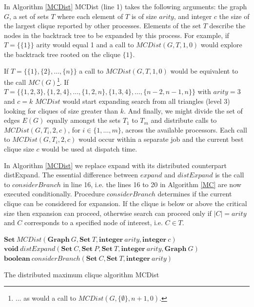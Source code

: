 \documentclass{l4proj}
\begin{document}
In Algorithm \ref{MCDist} MCDist (line 1) takes the 
following arguments: the graph $G$, a set of sets $T$ where 
each element of $T$ is of size $arity$, and integer $c$ the size of the largest clique reported by other processes. Elements
of the set $T$ describe the nodes in the backtrack tree to be expanded by this process. For example, if 
$T = \{\{1\}\}$ arity would equal 1 and a call to $MCDist(G,T,1,0)$ would explore the backtrack tree rooted on the clique $\{1\}$.

If $T = \{\{1\},\{2\},\ldots,\{n\}\}$ a call to $MCDist(G,T,1,0)$ would be equivalent to the call 
$MC(G)$\footnote{... as would a call to $MCDist(G,\{\emptyset\},n+1,0)$.}.
If $T = \{\{1,2,3\},\{1,2,4\},\ldots,\{1,2,n\},\{1,3,4\},\ldots,\{n-2,n-1,n\}\}$ with $arity = 3$ and $c = k$
$MCDist$ would start expanding search from all triangles (level 3) looking for cliques of size greater than $k$.
And finally, we might divide the set of edges $E(G)$ equally amongst the sets $T_1$ to $T_m$ and
distribute calls to $MCDist(G,T_{i},2,c)$, for $i \in \{1,\ldots,m\}$, across the available processors. Each call to
$MCDist(G,T_{i},2,c)$ would occur within a separate job and the current best clique size $c$ would be used at dispatch time.

In Algorithm \ref{MCDist} we replace expand with its distributed counterpart distExpand. The essential difference between 
$expand$ and $distExpand$ is the call to $considerBranch$ in line 16, i.e. the lines 16 to 20 
in Algorithm \ref{MC} are now executed conditionally. Procedure $considerBranch$ determines if the current clique can be 
considered for expansion. If the clique is below or above the critical size then expansion can proceed, otherwise
search can proceed only if $|C| = arity$ and $C$ corresponds to a specified node of interest, i.e. $C \in T$.

\begin{algorithm}
\DontPrintSemicolon
\nl $\textbf{Set} ~ MCDist(\textbf{Graph}~G,\textbf{Set}~T,\textbf{integer}~arity,\textbf{integer}~c)$ \;
\nl {}
\;
\nl $\textbf{void} ~ distExpand(\textbf{Set}~C,\textbf{Set}~P,\textbf{Set}~T,\textbf{integer}~arity,\textbf{Graph}~G)$ \;
\nl {}
\;
\nl $\textbf{boolean} ~ considerBranch(\textbf{Set}~C,\textbf{Set}~T,\textbf{integer}~arity)$ \;
\nl {}
\caption{The distributed maximum clique algorithm MCDist}
\label{MCDist}
\end{algorithm}
\end{document}
